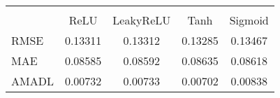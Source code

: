 \begin{tabular}{lcccc}
\hline\hline \\ [-1.8ex]
 & ReLU & LeakyReLU & Tanh & Sigmoid \\ 
 \hline 
RMSE & 0.13311 & 0.13312 & 0.13285 & 0.13467 \\ 
MAE & 0.08585 & 0.08592 & 0.08635 & 0.08618 \\ 
AMADL & 0.00732 & 0.00733 & 0.00702 & 0.00838 \\ 
\hline\hline
\end{tabular}